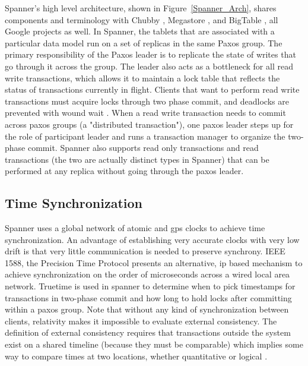 \documentclass[10pt,twocolumn]{article}
\begin{document}
Spanner's high level architecture, shown in Figure~\ref{Spanner_Arch}, shares components and terminology with Chubby  \cite{chandra_paxos_2007}, Megastore \cite{baker_megastore:_2011}, and BigTable \cite{chang_bigtable:_2008}, all Google projects as well. In Spanner, the tablets that are associated with a particular data model run on a set of replicas in the same Paxos group. The primary responsibility of the Paxos leader is to replicate the state of writes that go through it across the group. The leader also acts as a bottleneck for all read write transactions, which allows it to maintain a lock table that reflects the status of transactions currently in flight. Clients that want to perform read write transactions must acquire locks through two phase commit, and deadlocks are prevented with wound wait \cite{wound_wait}. When a read write transaction needs to commit across paxos groups (a "distributed transaction"), one paxos leader steps up for the role of participant leader and runs a transaction manager to organize the two-phase commit. Spanner also supports read only transactions and read transactions (the two are actually distinct types in Spanner) that can be performed at any replica without going through the paxos leader.


\subsection{Time Synchronization}
Spanner uses a global network of atomic and gps clocks to achieve time synchronization. An advantage of establishing very accurate clocks with very low drift is that very little communication is needed to preserve synchrony. IEEE 1588, the Precision Time Protocol \cite{ratzel_toward_2012} presents an alternative, ip based mechanism to achieve synchronization on the order of microseconds across a wired local area network. Truetime is used in spanner to determine when to pick timestamps for transactions in two-phase commit and how long to hold locks after committing within a paxos group.  Note that without any kind of synchronization between clients, relativity makes it impossible to evaluate external consistency. The definition of external consistency requires that transactions outside the system exist on a shared timeline (because they must be comparable) which implies some way to compare times at two locations, whether quantitative or logical \cite{lamport_time_1978}.
\end{document}

